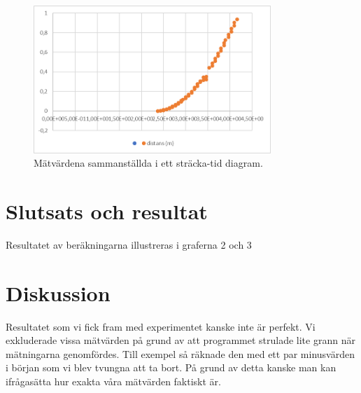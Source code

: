 \documentclass[11p, titlepage, oneside, a4paper]{article}
\begin{document}
    \begin{figure}[!h]
        \includegraphics[width=0.8\textwidth]{images/img_1.png}
        \caption{Mätvärdena sammanställda i ett sträcka-tid diagram.}
        \label{fig:graf1}
    \end{figure}
    
    \section{Slutsats och resultat} 
        Resultatet av beräkningarna illustreras i graferna 2 och 3
    \section{Diskussion} 
    Resultatet som vi fick fram med experimentet kanske inte är perfekt. Vi exkluderade vissa mätvärden på grund av att programmet strulade lite grann när mätningarna genomfördes. Till exempel så räknade den med ett par minusvärden i början som vi blev tvungna att ta bort. På grund av detta kanske man kan ifrågasätta hur exakta våra mätvärden faktiskt är.

    
    \printbibliography
\end{document}

